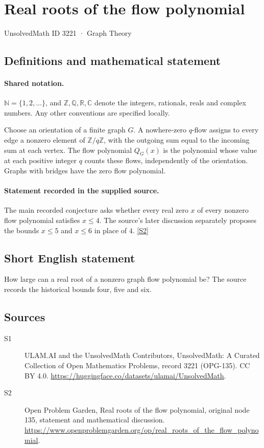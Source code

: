 \documentclass[11pt]{article}
\newcommand{\sref}[2]{\hyperlink{source:#1:#2}{[S#2]}}
\begin{document}
\setcounter{section}{3220}
\section{Real roots of the flow polynomial}\label{3221}
{\small\sffamily UnsolvedMath ID 3221 · Graph Theory}
\subsection{Definitions and mathematical statement}

\paragraph{Shared notation.}$\mathbb N=\{1,2,\ldots\}$, and $\mathbb Z,\mathbb Q,\mathbb R,\mathbb C$ denote the integers, rationals, reals and complex numbers. Any other conventions are specified locally.


Choose an orientation of a finite graph $G$. A nowhere-zero $q$-flow assigns to every edge a nonzero element of $\mathbb Z/q\mathbb Z$, with the outgoing sum equal to the incoming sum at each vertex. The flow polynomial $Q_G(x)$ is the polynomial whose value at each positive integer $q$ counts these flows, independently of the orientation. Graphs with bridges have the zero flow polynomial.
\paragraph{Statement recorded in the supplied source.}
The main recorded conjecture asks whether every real zero $x$ of every nonzero flow polynomial satisfies $x\le4$. The source's later discussion separately proposes the bounds $x\le5$ and $x\le6$ in place of $4$. \sref{3221}{2}
\subsection{Short English statement}
How large can a real root of a nonzero graph flow polynomial be? The source records the historical bounds four, five and six.
\subsection{Sources}
\begin{description}
\item[\hypertarget{source:3221:1}{S1}] ULAM.AI and the UnsolvedMath Contributors, UnsolvedMath: A Curated Collection of Open Mathematics Problems, record 3221 (OPG-135). CC BY 4.0. \url{https://huggingface.co/datasets/ulamai/UnsolvedMath}.
\item[\hypertarget{source:3221:2}{S2}] Open Problem Garden, Real roots of the flow polynomial, original node 135, statement and mathematical discussion. \url{https://www.openproblemgarden.org/op/real_roots_of_the_flow_polynomial}.
\end{description}
\label{end:3221}
\end{document}
